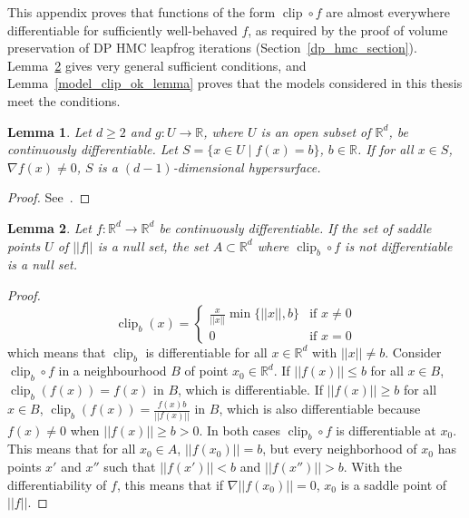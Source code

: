 \documentclass[english,twoside,openright]{HYgraduMLDS}
\newtheorem{lemma}{Lemma}
\newcommand{\R}{\mathbb{R}}
\DeclareMathOperator{\clip}{clip}
\begin{document}
\begin{appendices}
This appendix proves that functions of the form \(\clip\circ f\) are
almost everywhere differentiable for sufficiently well-behaved \(f\),
as required by the proof of volume preservation
of DP HMC leapfrog iterations (Section~\ref{dp_hmc_section}).
Lemma~\ref{clip_is_almost_everywhere_differentiable} gives very general
sufficient conditions, and Lemma~\ref{model_clip_ok_lemma} proves that the
models considered in this thesis meet the conditions.

\begin{lemma}\label{level_set_lemma}
  Let \(d \geq 2\) and \(g\colon U \to \R\), where \(U\) is an open subset of
  \(\R^{d}\), be continuously differentiable. Let \(S = \{x\in U\mid f(x) = b\}\),
  \(b\in \R\).
  If for all \(x\in S\), \(\nabla f(x) \neq 0\), \(S\) is a \((d - 1)\)-dimensional
  hypersurface.
\end{lemma}
\begin{proof}
	See~\cite[Section 9.2]{Tu11}.
\end{proof}

\begin{lemma}\label{clip_is_almost_everywhere_differentiable}
  Let \(f\colon \R^{d}\to \R^{d}\) be continuously differentiable.
  If the set of saddle points \(U\) of \(||f||\) is a null set,
  the set \(A\subset \R^{d}\)
  where \(\clip_{b} \circ f\) is not differentiable is a null set.
\end{lemma}
\begin{proof}
  \[
    \clip_{b}(x) =
    \begin{cases}
      \frac{x}{||x||}\min\{||x||, b\} & \text{if } x \neq 0\\
      0 & \text{if } x = 0
    \end{cases}
  \]
  which means that \(\clip_{b}\) is differentiable for all \(x\in \R^{d}\) with
  \(||x|| \neq b\). Consider \(\clip_{b}\circ f\) in a neighbourhood \(B\) of
  point \(x_{0}\in \R^{d}\). If \(||f(x)|| \leq b\) for all \(x\in B\),
  \(\clip_{b}(f(x)) = f(x)\) in \(B\), which is differentiable. If \(||f(x)|| \geq b\)
  for all \(x\in B\), \(\clip_{b}(f(x)) = \frac{f(x)b}{||f(x)||}\) in \(B\),
  which is also differentiable because \(f(x) \neq 0\) when
  \(||f(x)|| \geq b > 0\). In both cases \(\clip_{b}\circ f\) is differentiable
  at \(x_{0}\). This means that for all \(x_{0}\in A\), \(||f(x_{0})|| = b\), but
  every neighborhood
  of \(x_{0}\) has points \(x'\) and \(x''\) such that \(||f(x')|| < b\) and
  \(||f(x'')|| > b\). With the differentiability of \(f\), this means that
  if \(\nabla ||f(x_{0})|| = 0\), \(x_{0}\) is a saddle point of \(||f||\).


\end{proof}
\end{appendices}
\end{document}

